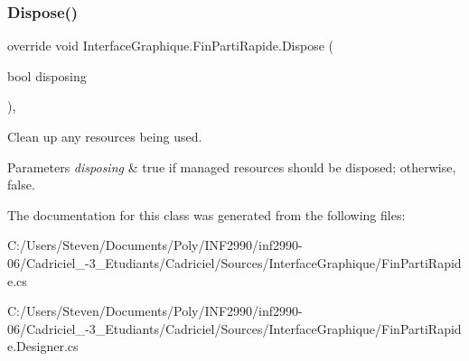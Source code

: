 \subsubsection{\texorpdfstring{Dispose()}{Dispose()}}
{\footnotesize\ttfamily override void Interface\+Graphique.\+Fin\+Parti\+Rapide.\+Dispose (\begin{DoxyParamCaption}\item[{bool}]{disposing }\end{DoxyParamCaption})\hspace{0.3cm}{\ttfamily [inline]}, {\ttfamily [protected]}}



Clean up any resources being used. 


\begin{DoxyParams}{Parameters}
{\em disposing} & true if managed resources should be disposed; otherwise, false.\\
\hline
\end{DoxyParams}


The documentation for this class was generated from the following files\+:\begin{DoxyCompactItemize}
\item 
C\+:/\+Users/\+Steven/\+Documents/\+Poly/\+I\+N\+F2990/inf2990-\/06/\+Cadriciel\+\_-\/3\+\_\+\+Etudiants/\+Cadriciel/\+Sources/\+Interface\+Graphique/Fin\+Parti\+Rapide.\+cs\item 
C\+:/\+Users/\+Steven/\+Documents/\+Poly/\+I\+N\+F2990/inf2990-\/06/\+Cadriciel\+\_-\/3\+\_\+\+Etudiants/\+Cadriciel/\+Sources/\+Interface\+Graphique/Fin\+Parti\+Rapide.\+Designer.\+cs\end{DoxyCompactItemize}
